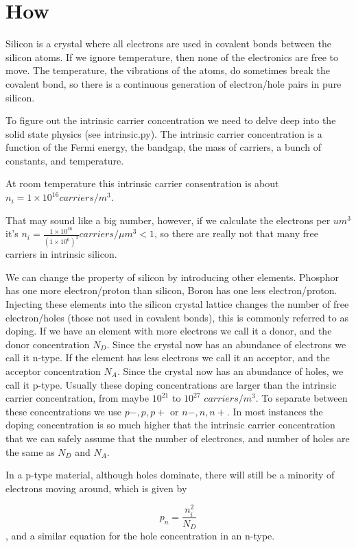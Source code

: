 \documentclass[technote,10pt,a4paper]{IEEEtran}
\newcommand{\eqn}[1]{
  \begin{equation}
    #1
  \end{equation}}
\begin{document}
\section{How}
Silicon is a crystal where all electrons are used in covalent bonds between the
silicon atoms. If we ignore temperature, then none of the electronics are
free to move. The temperature, the vibrations of the atoms, do sometimes
break the covalent bond, so there is a continuous generation of electron/hole
pairs in pure silicon.

To figure out the intrinsic carrier concentration we need
to delve deep into the solid state physics (see intrinsic.py). The intrinsic
carrier concentration is a function of the Fermi energy, the bandgap, the mass
of carriers, a bunch of constants, and temperature.

At room temperature this intrinsic carrier consentration is about
$ n_{i} =  1 \times 10^{16} carriers/m^3$.

That may sound like a big number, however, if we calculate the electrons per
$um^{3}$ it's
$n_{i} = \frac{1 \times 10^{16}}{(1 \times 10^{6})^{3}} carriers/\mu m^{3}< 1  $,
so there are really not that many free carriers in intrinsic silicon.

We can change the property of silicon by introducing other elements. Phosphor
has one more electron/proton than silicon, Boron has one less electron/proton.
Injecting these elements into the silicon crystal lattice changes the number of
free electron/holes (those not used in covalent bonds), this is commonly
referred to as doping. If we have an element
with more electrons we call it a donor, and the donor concentration $N_{D}$.
Since the crystal now has an abundance of electrons we call it n-type.
If the element has less electrons we call it an acceptor, and the acceptor
concentration $N_{A}$. Since the crystal now has an abundance of holes, we
call it p-type. Usually these doping concentrations are larger than the
intrinsic carrier concentration, from maybe $10^{21}$ to $10^{27}$
$carriers/m^{3}$. To separate between these concentrations we use $p-,p,p+$ or
$n-, n, n+$. In most instances the doping concentration is so much higher that
the intrinsic carrier concentration that we can safely assume that the number of
electroncs, and number of holes are the same as $N_{D}$ and $N_{A}$.

In a p-type material, although holes dominate, there will still be a minority of
electrons moving around, which is given by
\eqn{p_{n} = \frac{n_{i}^{2}}{N_{D}}}
, and a similar equation for the hole concentration in an n-type.
\end{document}
